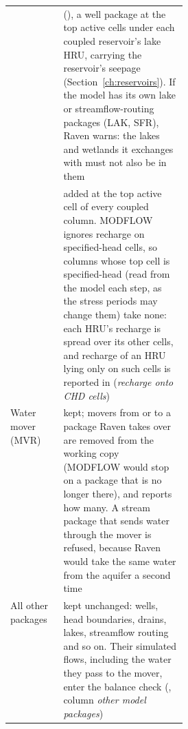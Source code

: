 \begin{table}[!htbp]
\begin{tabularx}{\linewidth}{P{0.30\linewidth}Y}
 &  (), a well package at the top active cells under each coupled reservoir's lake HRU, carrying the reservoir's seepage (Section~\ref{ch:reservoirs}). If the model has its own lake or streamflow-routing packages (LAK, SFR), Raven warns: the lakes and wetlands it exchanges with must not also be in them\\
 & added at the top active cell of every coupled column. MODFLOW ignores recharge on specified-head cells, so columns whose top cell is specified-head (read from the model each step, as the stress periods may change them) take none: each HRU's recharge is spread over its other cells, and recharge of an HRU lying only on such cells is reported in  (\emph{recharge onto CHD cells})\\
Water mover (MVR) & kept; movers from or to a package Raven takes over are removed from the working copy (MODFLOW would stop on a package that is no longer there), and  reports how many. A stream package that sends water through the mover is refused, because Raven would take the same water from the aquifer a second time\\
All other packages & kept unchanged: wells, head boundaries, drains, lakes, streamflow routing and so on. Their simulated flows, including the water they pass to the mover, enter the balance check (, column \emph{other model packages})\\\bottomrule
\end{tabularx}
\end{table}

